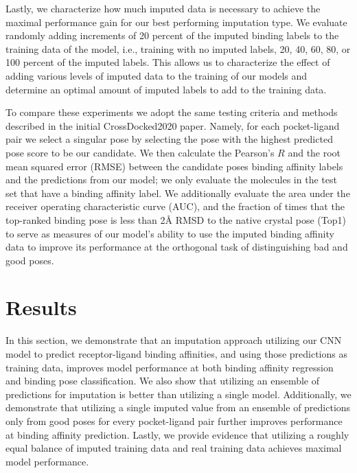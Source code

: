 \documentclass[journal=jcim,manuscript=article]{achemso}
\begin{document}
Lastly, we characterize how much imputed data is necessary to achieve the maximal performance gain for our best performing imputation type.
We evaluate randomly adding increments of 20 percent of the imputed binding labels to the training data of the model, i.e., training with no imputed labels, 20, 40, 60, 80, or 100 percent of the imputed labels.
This allows us to characterize the effect of adding various levels of imputed data to the training of our models and determine an optimal amount of imputed labels to add to the training data.

To compare these experiments we adopt the same testing criteria and methods described in the initial CrossDocked2020 paper\cite{crossdocked2020}.
Namely, for each pocket-ligand pair we select a singular pose by selecting the pose with the highest predicted pose score to be our candidate. 
We then calculate the Pearson's $R$ and the root mean squared error (RMSE) between the candidate poses binding affinity labels and the predictions from our model; we only evaluate the molecules in the test set that have a binding affinity label.
We additionally evaluate the area under the receiver operating characteristic curve (AUC), and the fraction of times that the top-ranked binding pose is less than 2{\AA} RMSD to the native crystal pose (Top1) to serve as measures of our model's ability to use the imputed binding affinity data to improve its performance at the orthogonal task of distinguishing bad and good poses.

\section{Results}
In this section, we demonstrate that an imputation approach utilizing our CNN model to predict receptor-ligand binding affinities, and using those predictions as training data, improves model performance at both binding affinity regression and binding pose classification.
We also show that utilizing an ensemble of predictions for imputation is better than utilizing a single model.
Additionally, we demonstrate that utilizing a single imputed value from an ensemble of predictions only from good poses for every pocket-ligand pair further improves performance at binding affinity prediction.
Lastly, we provide evidence that utilizing a roughly equal balance of imputed training data and real training data achieves maximal model performance.
\end{document}
